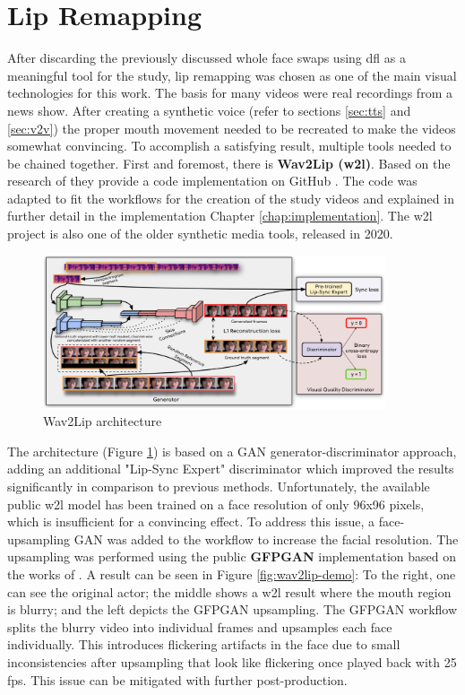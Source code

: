 \documentclass[
  a4paper,  %
  twoside,  %
  bibliography=totoc,
  headsepline,
  cleardoublepage=empty,
  parskip=half,
  draft=false
]{scrbook}
\begin{document}
\section{Lip Remapping}
\label{sec:lips}
After discarding the previously discussed whole face swaps using \gls{dfl} as a meaningful tool for the study, lip remapping was chosen as one of the main visual technologies for this work. The basis for many videos were real recordings from a news show. After creating a synthetic voice (refer to sections \ref{sec:tts} and \ref{sec:v2v}) the proper mouth movement needed to be recreated to make the videos somewhat convincing. To accomplish a satisfying result, multiple tools needed to be chained together. First and foremost, there is \textbf{Wav2Lip (\gls{w2l})}. Based on the research of \citet{prajwalLipSyncExpert2020} they provide a code implementation on GitHub \cite{mukhopadhyayWav2LipAccuratelyLipsyncing2023}. The code was adapted to fit the workflows for the creation of the study videos and explained in further detail in the implementation Chapter \ref{chap:implementation}. The \gls{w2l} project is also one of the older synthetic media tools, released in 2020.
\begin{figure}[h]
  \centering
  \includegraphics[width=0.9\textwidth]{./graphics/images/w2l-arch.png}
  \caption{Wav2Lip architecture}
  \label{fig:wav2lip-arch}
\end{figure}
The architecture (Figure \ref{fig:wav2lip-arch}) is based on a GAN generator-discriminator approach, adding an additional "Lip-Sync Expert" discriminator which improved the results significantly in comparison to previous methods.
Unfortunately, the available public \gls{w2l} model has been trained on a face resolution of only 96x96 pixels, which is insufficient for a convincing effect. To address this issue, a face-upsampling GAN was added to the workflow to increase the facial resolution. The upsampling was performed using the public \textbf{GFPGAN} implementation based on the works of \citet{wangNeuralSourcefilterbasedWaveform2019}. A result can be seen in Figure \ref{fig:wav2lip-demo}: To the right, one can see the original actor; the middle shows a \gls{w2l} result where the mouth region is blurry; and the left depicts the GFPGAN upsampling. The GFPGAN workflow splits the blurry video into individual frames and upsamples each face individually. This introduces flickering artifacts in the face due to small inconsistencies after upsampling that look like flickering once played back with 25 \gls{fps}. This issue can be mitigated with further post-production. \\
\end{document}
